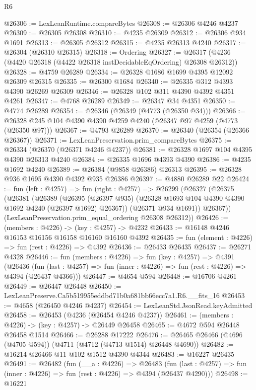 \begin{lexlean}{R6}
\begin{coremodule}
@26306 := LexLeanRuntime.compareBytes
@26308 := @26306 @4246 @4237
@26309 := @26305 @26308
@26310 := @4235 @26309
@26312 := @26306 @934 @1691
@26313 := @26305 @26312
@26315 := @4235 @26313 @4240
@26317 := @26304 (@26310 @26315)
@26318 := Ordering
@26327 := @26317 (@4236 (@4420 @26318 (@4422 @26318 instDecidableEqOrdering) @26308 @26312))
@26328 := @4759 @26289
@26334 := @26328 @1686 @1699 @4395 @12092 @26309 @26315
@26335 := @26300 @1684
@26340 := @26335 @312 @4393 @4390 @26269 @26309
@26346 := @26328 @102 @311 @4390 @4392 @4351 @4261
@26347 := @4768 @26289
@26349 := @26347 @34 @4351
@26350 := @4774 @26289
@26354 := @26346 (@26349 (@4773 (@26350 @34)))
@26366 := @26328 @245 @104 @4390 @4390 @4259 @4240 (@26347 @97 @4259 (@4773 (@26350 @97)))
@26367 := @4793 @26289
@26370 := @26340 (@26354 (@26366 @26367))
@26371 := LexLeanPreservation.prim_compareBytes
@26375 := @26334 (@26370 (@26371 @4246 @4237))
@26381 := @26328 @1697 @104 @4395 @4390 @26313 @4240
@26384 := @26335 @1696 @4393 @4390
@26386 := @4235 @1692 @4240
@26389 := @26384 (@9858 @26386) @26313
@26395 := @26328 @936 @1695 @4390 @4392 @935 @26386
@26397 := @4880 @26289 @22
@26424 := fun (left : @4257) =>
  fun (right : @4257) =>
  @26299
    (@26327
      (@26375
        (@26381
          (@26389
            (@26395 (@26397 @935) (@26328 @1693 @104 @4390 @4390 @1692 @4240 (@26397 @1692) @26367))
            (@26371 @934 @1691))
          @26367))
      (LexLeanPreservation.prim_equal_ordering @26308 @26312))
@26426 := (members : @4226) -> (key : @4257) -> @4232
@26433 := @16148 @4246 @16153 @16156 @16158 @16160 @16160 @4392
@26435 := fun (element : @4226) => fun (rest : @4226) => @4392
@26436 := @26433 @26435
@26437 := @26271 @4328
@26446 := fun (members : @4226) =>
  fun (key : @4257) =>
  @4391
    (@26436
      (fun (last : @4257) => fun (inner : @4226) => fun (rest : @4226) => @4394 (@26437 @4366)))
@26447 := @4654 @594
@26448 := @16706 @4261
@26449 := @26447 @26448
@26450 := LexLeanPreserve.Ca5b519955eddbd71b0a681bb66ecc7a1.R6.__fits_16
@26453 := @4658 (@26450 @4246 @4237)
@26454 := LexLeanStd.JsonRead.keyAdmitted
@26458 := @26453 (@4236 (@26454 @4246 @4237))
@26461 := (members : @4226) -> (key : @4257) -> @26449 @26458
@26465 := @4672 @594 @26448 @26458 @1514
@26466 := @26288 @17222
@26476 := @26465 @26466 (@4696 (@4705 @594)) (@4711 (@4712 (@4713 @1514) @26448 @4690))
@26482 := @16214 @26466 @11 @102 @1512 @4390 @4344
@26483 := @16227 @26435
@26491 := @26482
    (fun (__a : @4226) =>
    @26483
      (fun (last : @4257) => fun (inner : @4226) => fun (rest : @4226) => @4394 (@26437 @4290)))
@26498 := @16221

\end{coremodule}
\end{lexlean}
